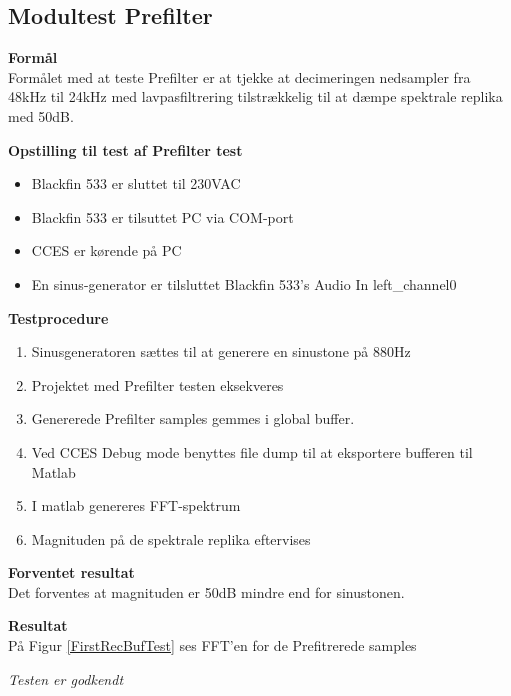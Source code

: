 \subsection{Modultest Prefilter}

\textbf{Formål} \\
Formålet med at teste Prefilter er at tjekke at decimeringen nedsampler fra 48kHz til 24kHz med lavpasfiltrering tilstrækkelig til at dæmpe spektrale replika med 50dB. 

\textbf{Opstilling til test af Prefilter test}

\begin{itemize}
	\item Blackfin 533 er sluttet til 230VAC
	\item Blackfin 533 er tilsuttet PC via COM-port
	\item CCES er kørende på PC
	\item En sinus-generator er tilsluttet Blackfin 533's Audio In left\_channel0
\end{itemize}

\textbf{Testprocedure}
\begin{enumerate}
	\item Sinusgeneratoren sættes til at generere en sinustone på 880Hz
	\item Projektet med Prefilter testen eksekveres 
	\item Genererede Prefilter samples gemmes i global buffer. 
	\item Ved CCES Debug mode benyttes file dump til at eksportere bufferen til Matlab
	\item I matlab genereres FFT-spektrum 
	\item Magnituden på de spektrale replika eftervises
\end{enumerate}

\textbf{Forventet resultat} \\
Det forventes at magnituden er 50dB mindre end for sinustonen. 


\textbf{Resultat} \\


På Figur \ref{FirstRecBufTest} ses FFT'en for de Prefitrerede samples 





\textit{Testen er godkendt}





